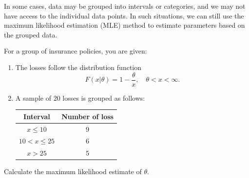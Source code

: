 In some cases, data may be grouped into intervals or categories, and we may not have access to the individual data points. In such situations, we can still use the maximum likelihood estimation (MLE) method to estimate parameters based on the grouped data.

\begin{example}
    For a group of insurance policies, you are given:
    \begin{enumerate}
        \item The losses follow the distribution function
        \[
            F(x|\theta) = 1 - \frac{\theta}{x}, \quad \theta < x < \infty.
        \]
        \item A sample of 20 losses is grouped as follows:
        \begin{table}[h!]
        \centering
        \begin{tabular}{|c|c|}
        \hline
        Interval & Number of loss \\
        \hline
        $x \leq 10$ & 9 \\
        $10 < x \leq 25$ & 6\\
        $x > 25$ & 5\\
        \hline
        \end{tabular}
        \end{table}
    \end{enumerate}
    Calculate the maximum likelihood estimate of $\theta$.
\end{example}

